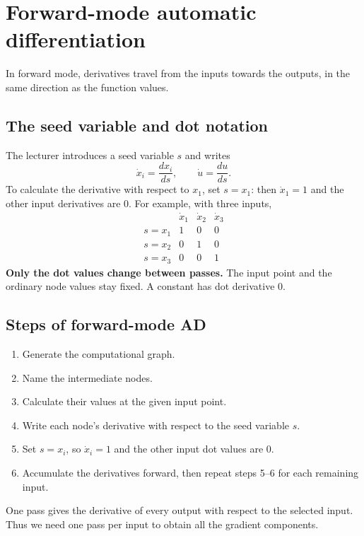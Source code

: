 \clearpage
\section{Forward-mode automatic differentiation}
In forward mode, derivatives travel from the inputs towards the outputs, in the same direction as the function values.

\subsection{The seed variable and dot notation}
The lecturer introduces a seed variable $s$ and writes
\[
 \dot x_i=\frac{dx_i}{ds},\qquad \dot u=\frac{du}{ds}.
\]
To calculate the derivative with respect to $x_1$, set $s=x_1$: then $\dot x_1=1$ and the other input derivatives are $0$. For example, with three inputs,
\[
\begin{array}{c|ccc}
 &\dot x_1&\dot x_2&\dot x_3\\\hline
s=x_1&1&0&0\\
s=x_2&0&1&0\\
s=x_3&0&0&1
\end{array}
\]
\textbf{Only the dot values change between passes.} The input point and the ordinary node values stay fixed. A constant has dot derivative $0$.

\subsection{Steps of forward-mode AD}
\begin{enumerate}
\item Generate the computational graph.
\item Name the intermediate nodes.
\item Calculate their values at the given input point.
\item Write each node's derivative with respect to the seed variable $s$.
\item Set $s=x_i$, so $\dot x_i=1$ and the other input dot values are $0$.
\item Accumulate the derivatives forward, then repeat steps 5--6 for each remaining input.
\end{enumerate}
One pass gives the derivative of every output with respect to the selected input. Thus we need one pass per input to obtain all the gradient components.

